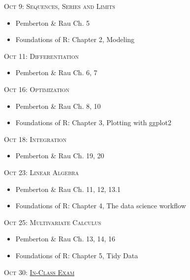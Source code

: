 \documentclass[11pt]{article}
\begin{document}
\noindent \textsc{Oct 9: Sequences, Series and Limits}

\begin{itemize}
\item Pemberton \& Rau Ch. 5
\item Foundations of R: Chapter 2, Modeling
\end{itemize}



\noindent \textsc{Oct 11:  Differentiation}

\begin{itemize}

\item Pemberton \& Rau Ch. 6, 7



\end{itemize}



\noindent \textsc{Oct 16: Optimization}

\begin{itemize}
\item Pemberton \& Rau Ch. 8, 10

\item Foundations of R: Chapter 3, Plotting with ggplot2


\end{itemize}


\noindent \textsc{Oct 18: Integration}

\begin{itemize}
\item Pemberton \& Rau Ch. 19, 20


\end{itemize}


\noindent \textsc{Oct 23:  Linear Algebra}

\begin{itemize}

\item Pemberton \& Rau Ch. 11, 12, 13.1

\item Foundations of R: Chapter 4, The data science workflow

\end{itemize}


\noindent \textsc{Oct 25:  Multivariate Calculus}

\begin{itemize}

\item Pemberton \& Rau Ch. 13, 14, 16
\item Foundations of R: Chapter 5, Tidy Data

\end{itemize}
\noindent \textsc{Oct 30:  \underline{In-Class Exam}}
\end{document}
